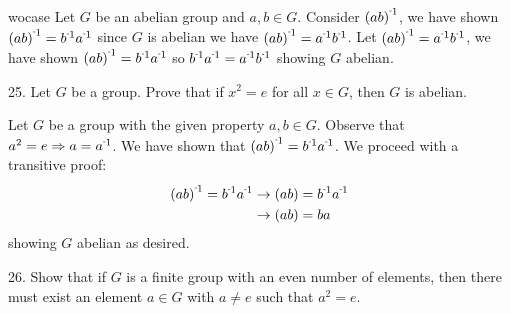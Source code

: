 \begin{mdframed}[style=darkAnswer,frametitle={Joe Starr}]
wocase{
    Let $G$ be an abelian group and $a,b\in G$. Consider $\inv{\lrp{ab}}$, we have
    shown $\inv{\lrp{ab}}=\inv{b}\inv{a}$ since $G$ is abelian we have
    $\inv{\lrp{ab}}=\inv{a}\inv{b}$.
  }{
    Let $\inv{\lrp{ab}}=\inv{a}\inv{b}$, we have shown
    $\inv{\lrp{ab}}=\inv{b}\inv{a}$ so $\inv{b}\inv{a}=\inv{a}\inv{b}$ showing $G$
    abelian.
  }
\end{mdframed}
\newpage
\begin{mdframed}[style=darkQuesion]
25. Let $G$ be a group. Prove that if $x^2=e$ for all $x\in G$, then $G$ is
abelian.
\end{mdframed}

\begin{mdframed}[style=darkAnswer,frametitle={Joe Starr}]
Let $G$ be a group with the given property $a,b\in G$. Observe that
$a^2=e \Rightarrow a=\inv{a}$. We have shown that
$\inv{\lrp{ab}}=\inv{b}\inv{a}$.
We proceed with a transitive proof:
\begin{align*}
\inv{\lrp{ab}}=\inv{b}\inv{a} & \rightarrow \lrp{ab}=\inv{b}\inv{a} \\
& \rightarrow \lrp{ab}={b}{a}
\end{align*}
showing $G$ abelian as desired.
\end{mdframed}
\newpage
\begin{mdframed}[style=darkQuesion]
26. Show that if $G$ is a finite group with an even number of elements, then
there must exist an element $a\in G$ with $a\neq e$ such that $a^2=e$.
\end{mdframed}

